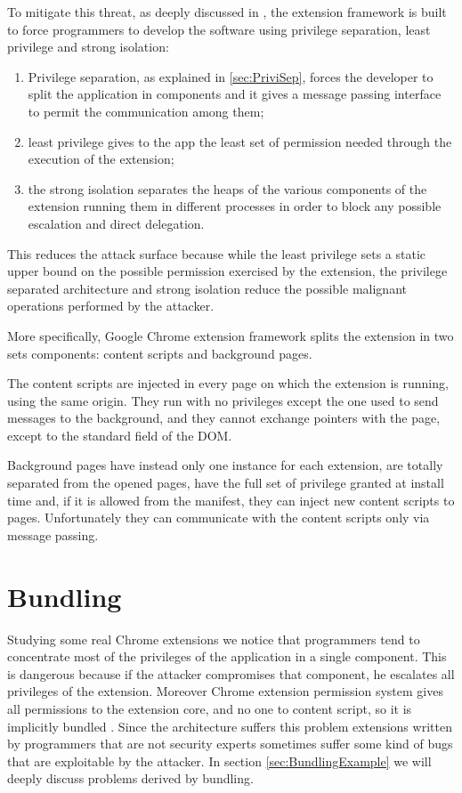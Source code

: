 To mitigate this threat, as deeply discussed in \cite{ChromeExtSpec}, the extension framework is built to force programmers to develop the software using privilege separation, least privilege and strong isolation:
\begin{enumerate}
\item Privilege separation, as explained in \ref{sec:PriviSep}, forces the developer to split the application in components and it gives a message passing interface to permit the communication among them; 
\item least privilege gives to the app the least set of permission needed through the execution of the extension;
\item the strong isolation separates the heaps of the various components of the extension running them in different processes in order to block any possible escalation and direct delegation.
\end{enumerate}

This reduces the attack surface because while the least privilege sets a static upper bound on the possible permission exercised by the extension, the privilege separated architecture and strong isolation reduce the possible malignant operations performed by the attacker.

More specifically, Google Chrome extension framework \cite{ChromeExtensionOnline} splits the extension in two sets components: content scripts and background pages. 

The content scripts are injected in every page on which the extension is running, using the same origin. They run with no privileges except the one used to send messages to the background, and they cannot exchange pointers with the page, except to the standard field of the DOM. 

Background pages have instead only one instance for each extension, are totally separated from the opened pages, have the full set of privilege granted at install time and, if it is allowed from the manifest, they can inject new content scripts to pages. Unfortunately they can communicate with the content scripts only via message passing.

\section{Bundling}
\label{sec:Bundling}
Studying some real Chrome extensions we notice that programmers tend to concentrate most of the privileges of the application in a single component. This is dangerous because if the attacker compromises that component, he escalates all privileges of the extension. Moreover Chrome extension permission system gives all permissions to the extension core, and no one to content script, so it is implicitly bundled \cite{PriviSep}. Since the architecture suffers this problem extensions written by programmers that are not security experts sometimes suffer some kind of bugs that are exploitable by the attacker. In section \ref{sec:BundlingExample} we will deeply discuss problems derived by bundling.

